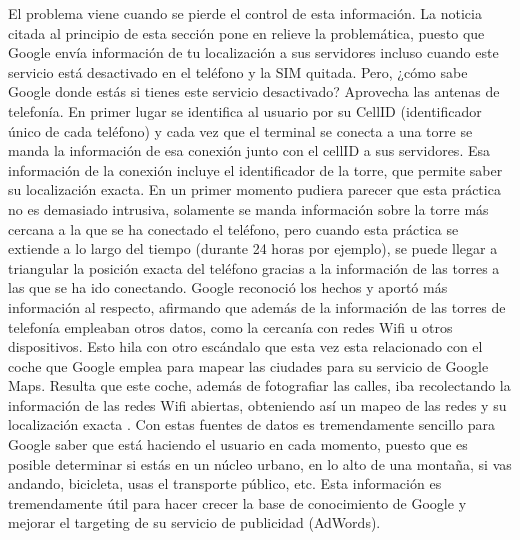 \documentclass[12pt,a4paper,oneside]{book} %
\begin{document}
\newline \newline 
El problema viene cuando se pierde el control de esta información. La  noticia citada al principio de esta sección pone en relieve la problemática, puesto que Google envía información de tu localización a sus servidores incluso cuando este servicio está desactivado en el teléfono y la SIM quitada. 
\newline \newline 
Pero, ¿cómo sabe Google donde estás si tienes este servicio desactivado? Aprovecha las antenas de telefonía. En primer lugar se identifica al usuario por su CellID (identificador único de cada teléfono) y cada vez que el terminal se conecta a una torre se manda la información de esa conexión junto con el cellID a sus servidores. Esa información de la conexión incluye el identificador de la torre, que permite saber su localización exacta. 
\newline \newline 
En un primer momento pudiera parecer que esta práctica no es demasiado intrusiva, solamente se manda información sobre la torre más cercana a la que se ha conectado el teléfono, pero cuando esta práctica se extiende a lo largo del tiempo (durante 24 horas por ejemplo), se puede llegar a triangular la posición exacta del teléfono gracias a la información de las torres a las que se ha ido conectando. 
\newline \newline 
Google reconoció los hechos y aportó más información al respecto, afirmando que además de la información de las torres de telefonía empleaban otros datos, como la cercanía con redes Wifi u otros dispositivos. 
\newline \newline 
Esto hila con otro escándalo que esta vez esta relacionado con el coche que Google emplea para mapear las ciudades para su servicio de Google Maps. Resulta que este coche, además de fotografiar las calles, iba recolectando la información de las redes Wifi abiertas, obteniendo así un mapeo de las redes y su localización exacta \cite{gmaps}. 
\newline \newline
Con estas fuentes de datos es tremendamente sencillo para Google saber que está haciendo el usuario en cada momento, puesto que es posible determinar si estás en un núcleo urbano, en lo alto de una montaña, si vas andando, bicicleta, usas el transporte público, etc. Esta información es tremendamente útil para hacer crecer la base de conocimiento de Google y mejorar el targeting de su servicio de publicidad (AdWords). 
\end{document}
